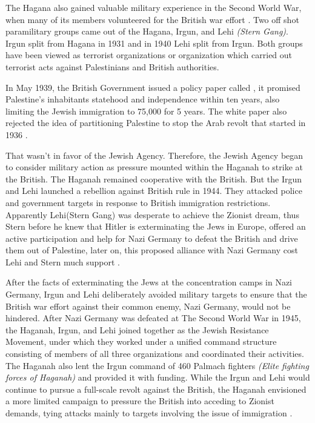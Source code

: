 The Hagana also gained valuable military experience in the Second
World War, when many of its members volunteered for the British war
effort \citep{Pappe2006}. Two off shot paramilitary groups came out of the Hagana, Irgun, and Lehi \textit{(Stern Gang)}. Irgun split from Hagana in 1931 and in 1940 Lehi split from Irgun\citep{Shlaim2014}. Both groups have been viewed as terrorist organizations or organization which carried out terrorist acts against Palestinians and British authorities\citep{Bell1976}.   


In May 1939, the British Government issued a policy paper called , it promised Palestine's inhabitants statehood and independence within ten years, also limiting the Jewish immigration to 75,000 for 5 years. The white paper also rejected the idea of partitioning Palestine to stop the Arab revolt that started in 1936 \citep{Morris2004, Fenby2018}.

That wasn't in favor of the Jewish Agency. Therefore, the Jewish Agency began to consider military action as pressure mounted within the Haganah to strike at the British. The Haganah remained cooperative with the British. But the Irgun and Lehi launched a rebellion against British rule in 1944. They attacked police and government targets in response to British immigration restrictions. 
Apparently Lehi(Stern Gang) was desperate to achieve the Zionist dream, thus Stern before he knew that Hitler is exterminating the Jews in Europe, offered an active participation and help for Nazi Germany to defeat the British and drive them out of Palestine, later on, this proposed alliance with Nazi Germany cost Lehi and Stern much support \citep{Shlaim2014, Heller1995, Grob-Fitzgibbon2011}. 

After the facts of exterminating the Jews at the concentration camps in Nazi Germany, Irgun and Lehi deliberately avoided military targets to ensure that the British war effort against their common enemy, Nazi Germany, would not be hindered. After Nazi Germany was defeated at The Second World War in 1945, the Haganah, Irgun, and Lehi joined together as the Jewish Resistance Movement, under which they worked under a unified command structure consisting of members of all three organizations and coordinated their activities. The Haganah also lent the Irgun command of 460 Palmach fighters \textit{(Elite fighting forces of Haganah)} and provided it with funding. While the Irgun and Lehi would continue to pursue a full-scale revolt against the British, the Haganah envisioned a more limited campaign to pressure the British into acceding to Zionist demands, tying attacks mainly to targets involving the issue of immigration \citep{Bell1976, Shlaim2014}.

